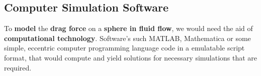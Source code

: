             
            
            
            
            
            
            
            
            
            
            
            
            
            
\subsection{{Computer Simulation Software}}
        
    {To \textbf{model} the \textbf{drag force} on a \textbf{sphere in fluid flow}, we would need the aid of \textbf{computational technology}. Software's such MATLAB, Mathematica or some simple, eccentric computer programming language code in a emulatable script format, that would compute and yield solutions for necessary simulations that are required.}
    
